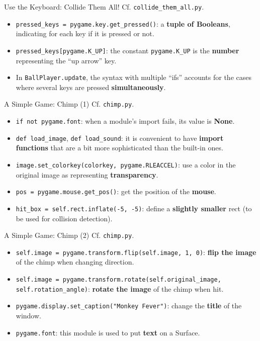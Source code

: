 \documentclass[aspectratio=169]{beamer}
\renewcommand{\emph}[1]{\textcolor{ClearTitle}{\bf #1}}
\begin{document}
\begin{frame}[fragile]{Use the Keyboard: Collide Them All!}
Cf. \verb|collide_them_all.py|.
\begin{itemize}
\item \verb|pressed_keys = pygame.key.get_pressed()|: a \emph{tuple of Booleans}, indicating for each key if it is pressed or not.
\item \verb|pressed_keys[pygame.K_UP]|: the constant \verb|pygame.K_UP| is the \emph{number} representing the ``up arrow'' key.
\item In \verb|BallPlayer.update|, the syntax with multiple ``ifs'' accounts for the cases where several keys are pressed \emph{simultaneously}.
\end{itemize}
\end{frame}

\begin{frame}[fragile]{A Simple Game: Chimp (1)}
Cf. \verb|chimp.py|.
\begin{itemize}
\item \verb|if not pygame.font|: when a module's import fails, its value is \emph{None}.
\item \verb|def load_image|, \verb|def load_sound|: it is convenient to have \emph{import functions} that are a bit more sophisticated than the built-in ones.
\item \verb|image.set_colorkey(colorkey, pygame.RLEACCEL)|: use a color in the original image as representing \emph{transparency}.
\item \verb|pos = pygame.mouse.get_pos()|: get the position of the \emph{mouse}.
\item \verb|hit_box = self.rect.inflate(-5, -5)|: define a \emph{slightly smaller} rect (to be used for collision detection).
\end{itemize}
\end{frame}

\begin{frame}[fragile]{A Simple Game: Chimp (2)}
Cf. \verb|chimp.py|.
\begin{itemize}
\item \verb|self.image = pygame.transform.flip(self.image, 1, 0)|: \emph{flip the image} of the chimp when changing direction.
\item \verb|self.image = pygame.transform.rotate(self.original_image,| \verb|self.rotation_angle)|: \emph{rotate the image} of the chimp when hit.
\item \verb|pygame.display.set_caption("Monkey Fever")|: change the \emph{title} of the window.
\item \verb|pygame.font|: this module is used to put \emph{text} on a Surface.
\end{itemize}
\end{frame}
\end{document}
